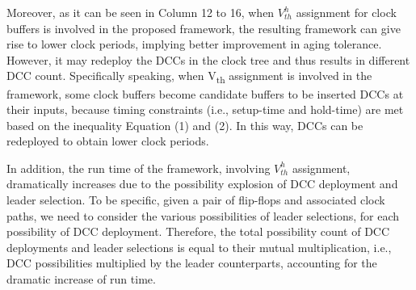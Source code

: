 Moreover, as it can be seen in Column 12 to 16, when $V_{th}^h$ assignment for clock buffers is involved in the proposed framework, the resulting framework can give rise to lower clock periods, implying better improvement in aging tolerance. However, it may redeploy the DCCs in the clock tree and thus results in different DCC count. Specifically speaking, when V\textsubscript{th} assignment is involved in the framework, some clock buffers become candidate buffers to be inserted DCCs at their inputs, because timing constraints (i.e., setup-time and hold-time) are met based on the inequality Equation (1) and (2). In this way, DCCs can be redeployed to obtain lower clock periods.


In addition, the run time of the framework, involving $V_{th}^h$ assignment, dramatically increases due to the possibility explosion of DCC deployment and leader selection. To be specific, given a pair of flip-flops and associated clock paths, we need to consider the various possibilities of leader selections, for each possibility of DCC deployment. Therefore, the total possibility count of DCC deployments and leader selections is equal to their mutual multiplication, i.e., DCC possibilities multiplied by the leader counterparts, accounting for the dramatic increase of run time.
